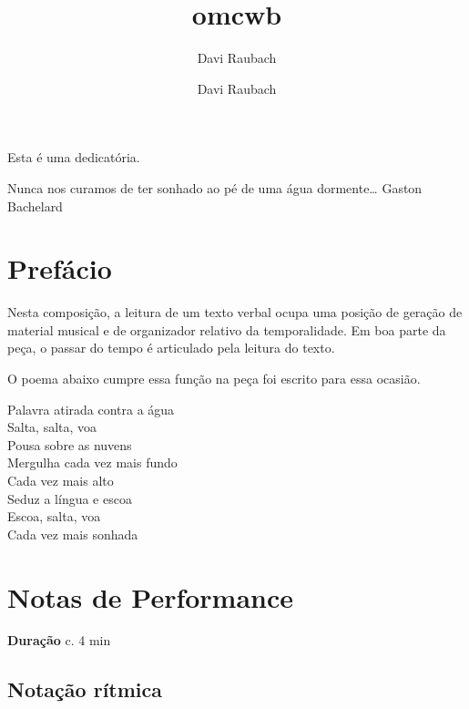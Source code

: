 \documentclass[article,12pt,openany,oneside,a4paper,chapter=TITLE,hyphen,english,brazil,chapter=TITLE,sumario=tradicional]{abntex2}
\author{Davi Raubach}
\author{Davi Raubach}
\date{}
\title{omcwb}
\begin{document}
\OnehalfSpacing

\pretextual

\imprimircapa
\newpage

\begin{dedicatoria}
\vspace*{\fill}
Esta é uma dedicatória.

\vspace*{\fill}
\end{dedicatoria}
\newpage

\begin{epigrafe}
\vspace*{\fill}
Nunca nos curamos de ter sonhado ao pé de uma água dormente\ldots{}
Gaston Bachelard
\vspace*{\fill}
\end{epigrafe}
\newpage



\textual


\section*{Prefácio}
\label{sec:orge44c1e8}
Nesta composição, a leitura de um texto verbal ocupa uma posição de geração de material musical e de organizador relativo da temporalidade. Em boa parte da peça, o passar do tempo é articulado pela leitura do texto.

O poema abaixo cumpre essa função na peça foi escrito para essa ocasião.

\begin{center}


Palavra atirada contra a água\\
Salta, salta, voa\\
Pousa sobre as nuvens\\
Mergulha cada vez mais fundo\\
Cada vez mais alto\\
Seduz a língua e escoa\\
Escoa, salta, voa\\
Cada vez mais sonhada
\end{center}


\section*{Notas de Performance}
\label{sec:org5e5cd7d}

\textbf{Duração} c. 4 min

\subsection*{Notação rítmica}
\label{sec:org523ab70}
\end{document}
